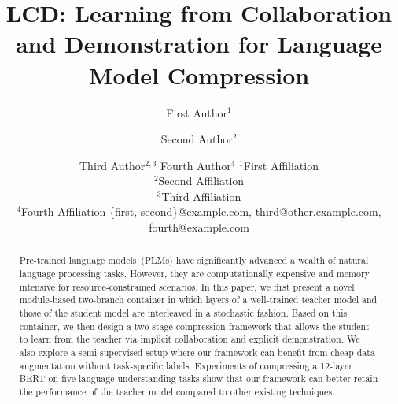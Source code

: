 \documentclass{article}
\title{LCD: Learning from Collaboration and Demonstration for Language Model Compression}
\author{
First Author$^1$
\and
Second Author$^2$\and
Third Author$^{2,3}$\And
Fourth Author$^4$
\affiliations
$^1$First Affiliation\\
$^2$Second Affiliation\\
$^3$Third Affiliation\\
$^4$Fourth Affiliation
\emails
\{first, second\}@example.com,
third@other.example.com,
fourth@example.com
}
\begin{document}
\maketitle

\begin{abstract}
Pre-trained language models~(PLMs) have significantly advanced a wealth of natural language processing tasks. However, they are computationally expensive and memory intensive for resource-constrained scenarios. 
In this paper, we first present a novel module-based two-branch container
in which layers of a well-trained teacher model and those of the student model are interleaved in a stochastic fashion. Based on this container, we then design a 
two-stage compression framework that allows the student to learn from the teacher 
via implicit collaboration and explicit demonstration. 
We also explore a semi-supervised setup where our framework can benefit from cheap 
data augmentation without task-specific labels. 
Experiments of compressing a 12-layer BERT on five language understanding tasks 
show that our framework can better retain the performance of the teacher model compared 
to other existing techniques. 
\end{abstract}










\end{document}
